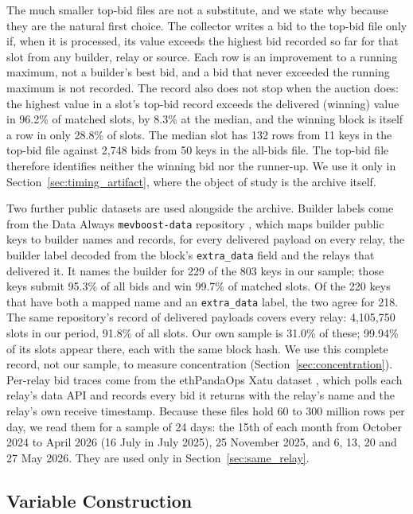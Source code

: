 \documentclass[11pt]{article}
\begin{document}
The much smaller top-bid files are not a substitute, and we state why because
they are the natural first choice. The collector writes a bid to the top-bid
file only if, when it is processed, its value exceeds the highest bid
recorded so far for that slot from any builder, relay or source. Each row is
an improvement to a running maximum, not a builder's best bid, and a bid
that never exceeded the running maximum is not recorded. The record also does
not stop when the auction does: the highest value in a slot's top-bid record
exceeds the delivered (winning) value in 96.2\% of matched slots, by 8.3\% at
the median, and the winning block is itself a row in only 28.8\% of slots.
The median slot has 132 rows from 11 keys in the top-bid file against 2,748
bids from 50 keys in the all-bids file. The top-bid file therefore
identifies neither the winning bid nor the runner-up. We use it only in
Section~\ref{sec:timing_artifact}, where the object of study is the archive
itself.

Two further public datasets are used alongside the archive. Builder labels
come from the Data Always \texttt{mevboost-data} repository
\citep{dataalways2024}, which maps builder public keys to builder names and
records, for every delivered payload on every relay, the builder label
decoded from the block's \texttt{extra\_data} field and the relays that
delivered it. It names the builder for 229 of the 803 keys in our sample;
those keys submit 95.3\% of all bids and win 99.7\% of matched slots. Of the
220 keys that have both a mapped name and an \texttt{extra\_data} label, the
two agree for 218. The same repository's record of delivered payloads covers every relay:
4,105,750 slots in our period, 91.8\% of all slots. Our own sample is 31.0\%
of these; 99.94\% of its slots appear there, each with the same block hash.
We use this complete record, not our sample, to measure concentration
(Section~\ref{sec:concentration}). Per-relay bid traces come from the ethPandaOps Xatu
dataset \citep{xatu2024}, which polls each relay's data API and records
every bid it returns with the relay's name and the relay's own receive
timestamp. Because these files hold 60 to 300 million rows per day, we read
them for a sample of 24 days: the 15th of each month from October 2024 to
April 2026 (16 July in July 2025), 25 November 2025, and 6, 13, 20 and 27 May
2026. They are used only in Section~\ref{sec:same_relay}.

\subsection{Variable Construction}
\end{document}
